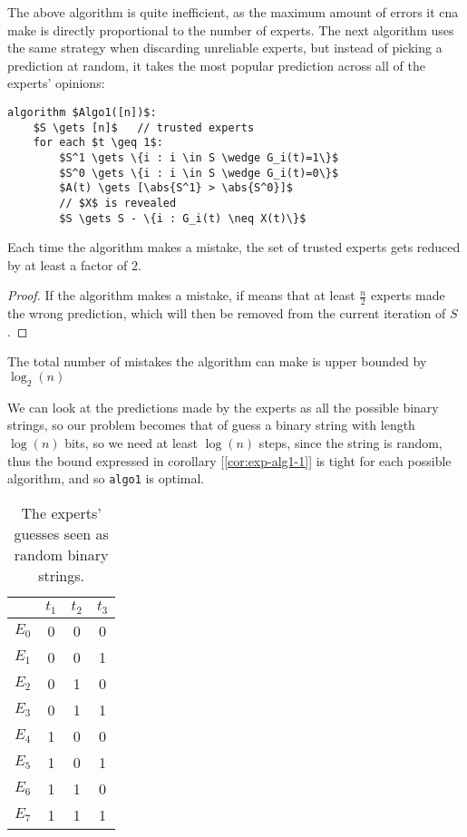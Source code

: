 The above algorithm is quite inefficient, as the maximum amount of errors it cna make is directly proportional to the number of experts. The next algorithm uses the same strategy when discarding unreliable experts, but instead of picking a prediction at random, it takes the most popular prediction across all of the experts' opinions:
\begin{lstlisting}[caption={Algo 1}, label={lst:exp-algo1}]
algorithm $Algo1([n])$:
    $S \gets [n]$   // trusted experts
    for each $t \geq 1$:
        $S^1 \gets \{i : i \in S \wedge G_i(t)=1\}$
        $S^0 \gets \{i : i \in S \wedge G_i(t)=0\}$
        $A(t) \gets [\abs{S^1} > \abs{S^0}]$
        // $X$ is revealed
        $S \gets S - \{i : G_i(t) \neq X(t)\}$
\end{lstlisting}

\begin{lemma}\label{lem:exp-alg1-1}
    Each time the algorithm makes a mistake, the set of trusted experts gets reduced by at least a factor of $2$.
\end{lemma}
\begin{proof}
    If the algorithm makes a mistake, if means that at least $\frac{n}{2}$ experts made the wrong prediction, which will then be removed from the current iteration of $S$.
\end{proof}

\begin{corollary}\label{cor:exp-alg1-1}
    The total number of mistakes the algorithm can make is upper bounded by $\log_2(n)$
\end{corollary}

\begin{observation}
    We can look at the predictions made by the experts as all the possible binary strings, so our problem becomes that of guess a binary string with length $\log(n)$ bits, so we need at least $\log(n)$ steps, since the string is random, thus the bound expressed in corollary [\ref{cor:exp-alg1-1}] is tight for each possible algorithm, and so \texttt{algo1} is optimal.
    
    \begin{table}[ht]
        \centering
        \begin{tabular}{c|c|c|c}
            & $t_1$ & $t_2$ & $t_3$ \\ \hline
            $E_0$ & 0     & 0     & 0     \\
            $E_1$ & 0     & 0     & 1     \\
            $E_2$ & 0     & 1     & 0     \\
            $E_3$ & 0     & 1     & 1     \\
            $E_4$ & 1     & 0     & 0     \\
            $E_5$ & 1     & 0     & 1     \\
            $E_6$ & 1     & 1     & 0     \\
            $E_7$ & 1     & 1     & 1    
        \end{tabular}
        \caption{The experts' guesses seen as random binary strings.}
        \label{tab:exp-alg1-strings}
    \end{table}
\end{observation}


